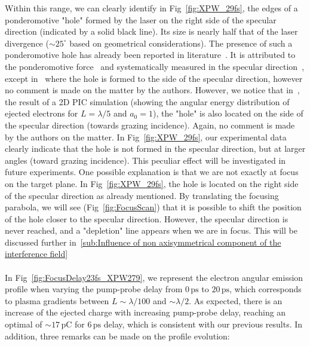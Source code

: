 \noindent Within this range, we can clearly identify in Fig~\ref{fig:XPW_29fs}, the edges of a ponderomotive "hole" formed by the laser on the right side of the specular direction (indicated by a solid black line). Its size is nearly half that of the laser divergence ($\sim 25^{\circ}$ based on geometrical considerations). The presence of such a ponderomotive hole has already been reported in literature~\cite{Wang2010,mordovanakis2009quasimonoenergetic,tian2012electron,thevenet2015}. It is attributed to the ponderomotive force~\cite{mordovanakis2009quasimonoenergetic} and systematically measured in the specular direction~\cite{thevenet2015,mordovanakis2009quasimonoenergetic}, except in~\cite{Wang2010} where the hole is formed to the side of the specular direction, however no comment is made on the matter by the authors. However, we notice that in~\cite{mordovanakis2009quasimonoenergetic}, the result of a 2D PIC simulation (showing the angular energy distribution of ejected electrons for $L= \lambda/5$ and $a_0 = 1$), the "hole" is also located on the side of the specular direction (towards grazing incidence). Again, no comment is made by the authors on the matter. In Fig~\ref{fig:XPW_29fs}, our experimental data clearly indicate that the hole is not formed in the specular direction, but at larger angles (toward grazing incidence). This peculiar effect will be investigated in future experiments. One possible explanation is that we are not exactly at focus on the target plane. In Fig~\ref{fig:XPW_29fs}, the hole is located on the right side of the specular direction as already mentioned. By translating the focusing parabola, we will see (Fig~\ref{fig:FocusScan}) that it is possible to shift the position of the hole closer to the specular direction. However, the specular direction is never reached, and a "depletion" line appears when we are in focus. This will be discussed further in~\ref{sub:Influence of non axisymmetrical component of the interference field} \\

\\

\noindent  In Fig~\ref{fig:FocusDelay23fs_XPW279}, we represent the electron angular emission profile when varying the pump-probe delay from $0\,\mathrm{ps}$ to $20\,\mathrm{ps}$, which corresponds to plasma gradients between $L\sim \lambda/100$ and $\sim \lambda/2$. As expected, there is an increase of the ejected charge with increasing pump-probe delay, reaching an optimal of $\sim17\,\mathrm{pC}$ for $6\,\mathrm{ps}$ delay, which is consistent with our previous results. In addition, three remarks can be made on the profile evolution:

